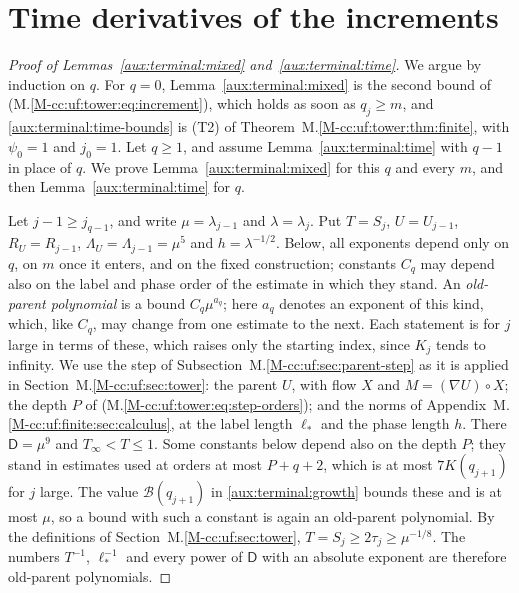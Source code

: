 \documentclass[11pt]{amsart}
\numberwithin{equation}{section}
\begin{document}
\section{Time derivatives of the increments}
\begin{proof}[Proof of Lemmas~\ref{aux:terminal:mixed} and~\ref{aux:terminal:time}]
We argue by induction on $q$. For $q=0$,
Lemma~\ref{aux:terminal:mixed} is the second bound of
\textup{(M.\ref{M-cc:uf:tower:eq:increment})}, which holds as soon as
$q_j\ge m$,
and \eqref{aux:terminal:time-bounds} is \textup{(T2)} of Theorem~M.\ref{M-cc:uf:tower:thm:finite}, with $\psi_0=1$ and
$j_0=1$. Let $q\ge1$, and assume Lemma~\ref{aux:terminal:time} with
$q-1$ in place of $q$. We prove Lemma~\ref{aux:terminal:mixed} for this
$q$ and every $m$, and then Lemma~\ref{aux:terminal:time} for $q$.

Let $j-1\ge j_{q-1}$, and write $\mu=\lambda_{j-1}$ and $\lambda=\lambda_j$.
Put $T=S_j$, $U=U_{j-1}$, $R_U=R_{j-1}$,
$\Lambda_U=\Lambda_{j-1}=\mu^5$ and $h=\lambda^{-1/2}$.
Below, all exponents depend only on $q$, on $m$ once it
enters, and on the fixed construction; constants $C_q$ may depend also
on the label and phase order of the estimate in which they stand. An
\emph{old-parent polynomial} is a
bound $C_q\mu^{a_q}$; here $a_q$ denotes an exponent of this kind, which,
like $C_q$, may change from one estimate to the next. Each statement is for $j$ large
in terms of these, which raises only the starting index, since
$K_j$ tends to infinity. We use the step of
Subsection~M.\ref{M-cc:uf:sec:parent-step} as it is applied in
Section~M.\ref{M-cc:uf:sec:tower}: the parent $U$,
with flow $X$ and $M=(\nabla U)\circ X$; the depth $P$ of
\textup{(M.\ref{M-cc:uf:tower:eq:step-orders})}; and the norms of
Appendix~M.\ref{M-cc:uf:finite:sec:calculus}, at the label length
$\ell_*$ and the phase length $h$. There
$\mathsf D=\mu^9$ and
$T_\infty<T\le1$. Some constants below depend also on the depth $P$;
they stand in estimates used at orders at most $P+q+2$, which
is at most $7K(q_{j+1})$ for $j$ large. The
value $\mathcal B(q_{j+1})$ in
\eqref{aux:terminal:growth} bounds these and is at most $\mu$, so a
bound with such a constant is again an old-parent polynomial.
By the definitions of Section~M.\ref{M-cc:uf:sec:tower},
$T=S_j\ge2\tau_j\ge\mu^{-1/8}$. The numbers $T^{-1}$, $\ell_*^{-1}$
and every power of $\mathsf D$ with an absolute exponent are therefore
old-parent polynomials.


\end{proof}
\end{document}
